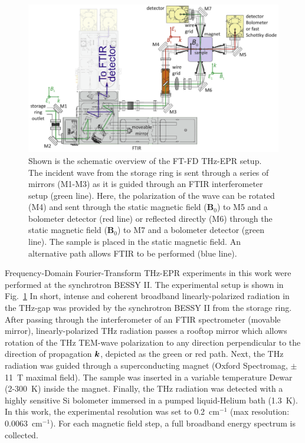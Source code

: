 \begin{figure}[htpb]
\centering
  \includegraphics[width=\textwidth]{Kapitel/Ch4-Images/Ch4-ExperimentSetup.eps}%
  \caption[Schematic Overview of FT-FD THz-EPR setup.]{Shown is the schematic overview of the FT-FD THz-EPR setup. The incident wave from the storage ring is sent through a series of mirrors (M1-M3) as it is guided through an FTIR interferometer setup (green line). Here, the polarization of the wave can be rotated (M4) and sent through the static magnetic field (\textbf{B}$_0$) to M5 and a bolometer detector (red line) or reflected directly (M6) through the static magnetic field (\textbf{B}$_0$) to M7 and a bolometer detector (green line). The sample is placed in the static magnetic field. An alternative path allows FTIR to be performed (blue line).}
  \label{ch4-fig:ExFDFTSetup}
\end{figure}

Frequency-Domain Fourier-Transform THz-EPR experiments in this work were performed at the synchrotron BESSY II. The experimental setup is shown in Fig.~\ref{ch4-fig:ExFDFTSetup} \cite{Schnegg09,Nehrkorn13} In short, intense and coherent broadband linearly-polarized radiation in the THz-gap was provided by the synchrotron BESSY II from the storage ring. \cite{AboBakr02} After passing through the interferometer of an FTIR spectrometer (movable mirror), linearly-polarized THz radiation passes a rooftop mirror which allows rotation of the THz TEM-wave polarization to any direction perpendicular to the direction of propagation $\boldsymbol{k}$, depicted as the green or red path. Next, the THz radiation was guided through a superconducting magnet (Oxford Spectromag, $\pm$11~T maximal field). The sample was inserted in a variable temperature Dewar (2-300~K) inside the magnet. Finally, the THz radiation was detected with a highly sensitive Si bolometer immersed in a pumped liquid-Helium bath (1.3~K). In this work, the experimental resolution was set to 0.2~cm$^{-1}$ (max resolution: 0.0063~cm$^{-1}$). For each magnetic field step, a full broadband energy spectrum is collected. 

